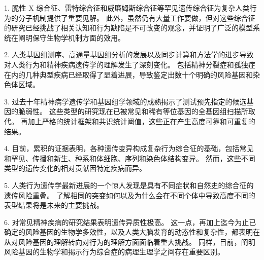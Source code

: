 1. 脆性 X 综合征、雷特综合征和威廉姆斯综合征等罕见遗传综合征为复杂人类行为的分子机制提供了重要见解。 
此外，虽然仍有大量工作要做，但对这些综合征的研究已经挑战了相关认知和行为缺陷是不可改变的观念，并证明了广泛的模型系统在阐明保守生物学机制方面的效用。


2. 人类基因组测序、高通量基因组分析的发展以及同步计算和方法学的进步导致对人类行为和精神疾病遗传学的理解发生了深刻变化。 
包括精神分裂症和孤独症在内的几种典型疾病已经取得了显着进展，导致鉴定出数十个明确的风险基因和染色体区域。


3. 过去十年精神病学遗传学和基因组学领域的成熟揭示了测试预先指定的候选基因的脆弱性。 
这些类型的研究现在已被常见和稀有等位基因的全基因组扫描所取代。 
再加上严格的统计框架和共识统计阈值，这些正在产生高度可靠和可重复的结果。


4. 目前，累积的证据表明，各种遗传变异构成复杂行为综合征的基础，包括常见和罕见、传播和新生、种系和体细胞、序列和染色体结构变异。 
然而，这些不同类型的遗传变化的相对贡献因特定疾病而异。


5. 人类行为遗传学最新进展的一个惊人发现是具有不同症状和自然史的综合征的遗传风险重叠。 
了解相同的突变如何以及为什么会在不同个体中导致高度不同的表型结果将是未来的主要挑战。


6. 对常见精神疾病的研究结果表明遗传异质性极高。 
这一点，再加上迄今为止已确定的风险基因的生物学多效性，以及人类大脑发育的动态性和复杂性，都表明在从对风险基因的理解转向对行为的理解方面面临着重大挑战。 
同样，目前，阐明风险基因的生物学和揭示行为综合症的病理生理学之间存在重要区别。






